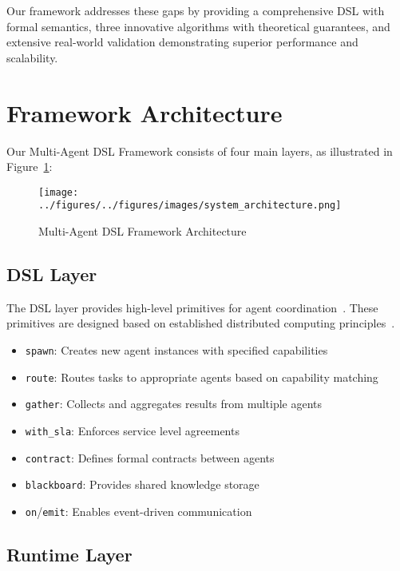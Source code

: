 \documentclass[conference]{IEEEtran}
\begin{document}
Our framework addresses these gaps by providing a comprehensive DSL with formal semantics, three innovative algorithms with theoretical guarantees, and extensive real-world validation demonstrating superior performance and scalability.

\section{Framework Architecture}

Our Multi-Agent DSL Framework consists of four main layers, as illustrated in Figure~\ref{fig:architecture}:

\begin{figure}[htbp]
\centering
\texttt{[image: ../figures/../figures/images/system\_architecture.png]}
\caption{Multi-Agent DSL Framework Architecture}
\label{fig:architecture}
\end{figure}

\subsection{DSL Layer}

The DSL layer provides high-level primitives for agent coordination~\cite{herlihy2012art,attiya2004distributed}. These primitives are designed based on established distributed computing principles~\cite{musa2004software}.

\begin{itemize}
\item \texttt{spawn}: Creates new agent instances with specified capabilities
\item \texttt{route}: Routes tasks to appropriate agents based on capability matching
\item \texttt{gather}: Collects and aggregates results from multiple agents
\item \texttt{with\_sla}: Enforces service level agreements
\item \texttt{contract}: Defines formal contracts between agents
\item \texttt{blackboard}: Provides shared knowledge storage
\item \texttt{on}/\texttt{emit}: Enables event-driven communication
\end{itemize}

\subsection{Runtime Layer}
\end{document}
